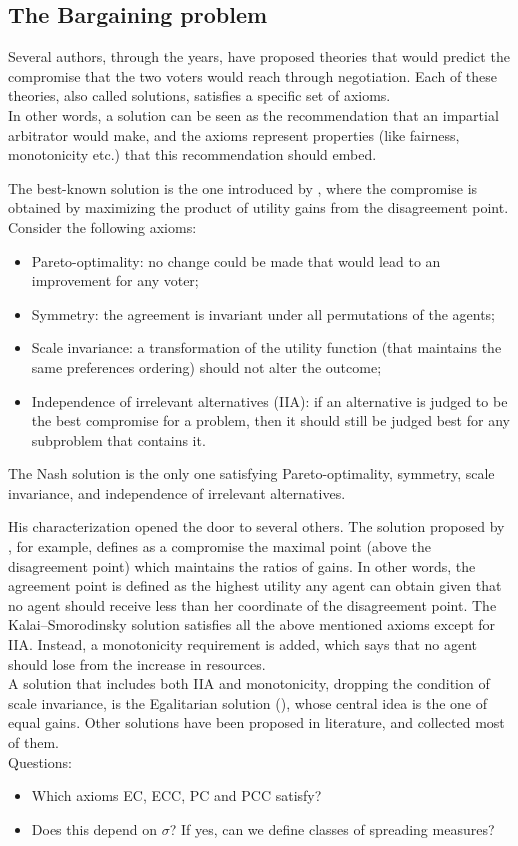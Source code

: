 \documentclass[version=3.21, pagesize, twoside=off, bibliography=totoc, DIV=calc, fontsize=12pt, a4paper]{scrartcl}
\begin{document}
\subsection{The Bargaining problem}
Several authors, through the years, have proposed theories that would predict the compromise that the two voters would reach through negotiation. Each of these theories, also called solutions, satisfies a specific set of axioms.
\\ 
In other words, a solution can be seen as the recommendation that an impartial arbitrator would make, and the axioms represent properties (like fairness, monotonicity etc.) that this recommendation should embed. 

The best-known solution is the one introduced by \cite{Nash1950}, where the compromise is obtained by maximizing the product of utility gains from the disagreement point.
Consider the following axioms:
\begin{itemize}
	\item Pareto-optimality: no change could be made that would lead to an improvement for any voter;
	\item Symmetry: the agreement is invariant under all permutations of the agents;
	\item Scale invariance: a transformation of the utility function (that maintains the same preferences ordering) should not alter the outcome;
	\item Independence of irrelevant alternatives (IIA): if an alternative is judged to be the best compromise for a problem, then it should still be judged best for any subproblem that contains it.
\end{itemize}

The Nash solution is the only one satisfying Pareto-optimality, symmetry, scale invariance, and independence of irrelevant alternatives.

His characterization opened the door to several others. The solution proposed by \cite{Kalai1975}, for example, defines as a compromise the maximal point (above the disagreement point) which maintains the ratios of gains. In other words, the agreement point is defined as the highest utility any agent can obtain given that no agent should receive less than her coordinate of the disagreement point.
The Kalai–Smorodinsky solution satisfies all the above mentioned axioms except for IIA. Instead, a monotonicity requirement is added, which says that no agent should lose from the increase in resources.
\\
A solution that includes both IIA and monotonicity, dropping the condition of scale invariance, is the Egalitarian solution (\cite{Kalai1977}), whose central idea is the one of equal gains.
\newline
Other solutions have been proposed in literature, and \cite{Thomson1994} collected most of them.
\newline\\
Questions:
\begin{itemize}
	\item Which axioms EC, ECC, PC and PCC satisfy?
	\item Does this depend on $\sigma$? If yes, can we define classes of spreading measures?
\end{itemize}
\end{document}
